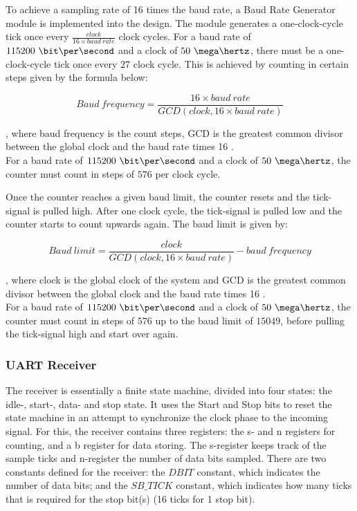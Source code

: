 \documentclass[main.tex]{subfiles}
\begin{document}
To achieve a sampling rate of 16 times the baud rate, a Baud Rate Generator module is implemented into the design. The module generates a one-clock-cycle tick once every $\frac{clock}{16 \times baud\ rate}$ clock cycles. For a baud rate of $115200\ \bit\per\second$ and a clock of $50\ \mega\hertz$, there must be a one-clock-cycle tick once every $27$ clock cycle. This is achieved by counting in certain steps given by the formula below:

\begin{equation}
Baud\ frequency = \frac{16 \times baud\ rate}{GCD(clock, 16 \times baud\ rate)}
\end{equation}

, where baud frequency is the count steps, GCD is the greatest common divisor between the global clock and the baud rate times 16 \cite{velure10}. \\
For a baud rate of $115200\ \bit\per\second$ and a clock of $50\ \mega\hertz$, the counter must count in steps of $576$ per clock cycle. 

Once the counter reaches a given baud limit, the counter resets and the tick-signal is pulled high. After one clock cycle, the tick-signal is pulled low and the counter starts to count upwards again. The baud limit is given by:

\begin{equation}
Baud\ limit= \frac{clock}{GCD(clock, 16 \times baud\ rate)} - baud\ frequency
\end{equation}

, where clock is the global clock of the system and GCD is the greatest common divisor between the global clock and the baud rate times 16 \cite{velure10}. \\
For a baud rate of $115200\ \bit\per\second$ and a clock of $50\ \mega\hertz$, the counter must count in steps of $576$ up to the baud limit of $15049$, before pulling the tick-signal high and start over again. 

\subsubsection{UART Receiver}
The receiver is essentially a finite state machine, divided into four states: the idle-, start-, data- and stop state. It uses the Start and Stop bits to reset the state machine in an attempt to synchronize the clock phase to the incoming signal. For this, the receiver contains three registers: the s- and  n registers for counting, and a b register for data storing. The s-register keeps track of the sample ticks and n-register the number of data bits sampled.
There are two constants defined for the receiver: the $DBIT$ constant, which indicates the number of data bits; and the $SB\_TICK$ constant, which indicates how many ticks that is required for the stop bit(s) (16 ticks for 1 stop bit). 
\end{document}
